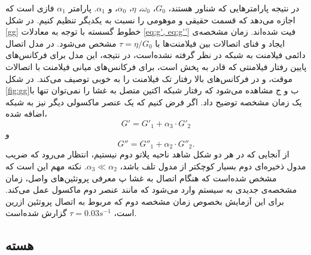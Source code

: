 در نتیجه پارامتر‌هایی که شناور هستند، $G_0$، $\omega_0$، $\eta$، $\alpha_0$، و $\alpha_1$. پارامتر $\alpha_1$ فازی است که اجازه می‌دهد که قسمت حقیقی و موهومی را نسبت به یکدیگر تنظیم کنیم. در شکل \ref{gg} خطوط گسسته با توجه به معادلات \ref{eq:g', eq:g''} فیت شده‌اند. زمان مشخصه‌ی ایجاد و فنای اتصالات بین فیلامنت‌ها با $\tau=\eta/G_0$ مشخص می‌شود. در مدل اتصال دائمی‌ فیلامنت به شبکه در نظر گرفته نشده‌است، در نتیجه، این مدل برای فرکانس‌های پایین رفتار فیلامنتی که قادر به پخش است، برای فرکانس‌های میانی فیلامنت با اتصالات موقت، و در فرکانس‌های بالا رفتار تک فیلامنت را به خوبی توصیف می‌کند. در شکل \ref{fig:gg}ب و ج مشاهده می‌شود که رفتار شبکه اکتین متصل به غشا را نمی‌توان تنها با یک زمان مشخصه توضیح داد. اگر فرض کنیم که یک عنصر ماکسولی دیگر نیز به شبکه اضافه شده،
\begin{equation}
G'=G'_1+\alpha_3\cdot G'_2
\label{eq:g'2}
\end{equation}
و
\begin{equation}
G''=G''_1+\alpha_2\cdot G''_2.
\label{eq:g''2}
\end{equation}
از آنجایی که در هر دو شکل شاهد ناحیه پلاتو دوم نیستیم، انتظار می‌رود که ضریب مدول ذخیره‌ای دوم بسیار کوچکتر از مدول تلف باشد، $\alpha_3\ll\alpha_2$. نکته مهم این است که مشخص شده‌است که هنگام اتصال به غشا پ معرفی پروتئین‌های واصل، زمان مشخصه‌ی جدیدی به سیستم وارد می‌شود که مانند عنصر دوم ماکسول عمل می‌کند. برای این آزمایش بخصوص زمان مشخصه دوم که مربوط به اتصال پروتئین ازرین است، $\tau=0.03 s^{-1}$ گزارش شده‌است. \cite{doi:10.1021/acs.jpcb.7b11491}

\subsection{هسته}\label{lab:nucleus}

